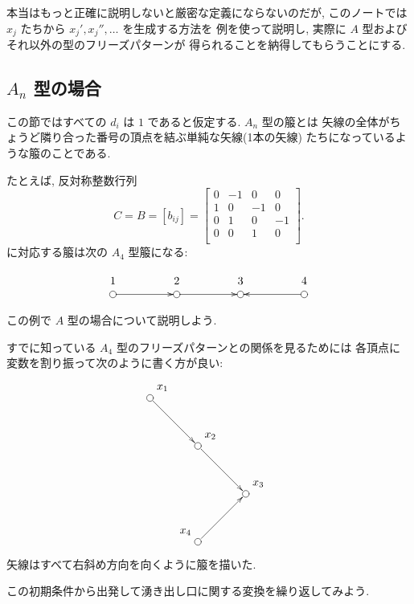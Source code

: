 \documentclass[12pt,twoside,dvipdfm]{jarticle}
\theoremstyle{definition} %
\theoremstyle{definition} %
\theoremstyle{definition} %
\numberwithin{theorem}{section}
\numberwithin{equation}{section}
\numberwithin{figure}{section}
\numberwithin{table}{section}
\begin{document}
本当はもっと正確に説明しないと厳密な定義にならないのだが, 
このノートでは $x_j$ たちから $x_j',x_j'',\ldots$ を生成する方法を
例を使って説明し, 実際に $A$ 型およびそれ以外の型のフリーズパターンが
得られることを納得してもらうことにする.


\subsection{$A_n$ 型の場合}

この節ではすべての $d_i$ は $1$ であると仮定する.
$A_n$ 型の箙とは
矢線の全体がちょうど隣り合った番号の頂点を結ぶ単純な矢線(1本の矢線)
たちになっているような箙のことである.

たとえば, 反対称整数行列
\begin{equation*}
C = B = [b_{ij}] =
\begin{bmatrix}
  0 &-1 & 0 & 0 \\
  1 & 0 &-1 & 0 \\
  0 & 1 & 0 &-1 \\
  0 & 0 & 1 & 0 \\
\end{bmatrix}.
\end{equation*}
に対応する箙は次の $A_4$ 型箙になる:
\[
\begin{xy}
 ( 0,10) *+[Fo]{}="1"*+++!D{1},
 (20,10) *+[Fo]{}="2"*+++!D{2},
 (40,10) *+[Fo]{}="3"*+++!D{3},
 (60,10) *+[Fo]{}="4"*+++!D{4},
 \ar@{->}"1";"2",
 \ar@{->}"2";"3",
 \ar@{->}"4";"3"
\end{xy}
\]
この例で $A$ 型の場合について説明しよう.

すでに知っている $A_4$ 型のフリーズパターンとの関係を見るためには
各頂点に変数を割り振って次のように書く方が良い:
\[
\begin{xy}
 ( 0,45) *+[Fo]{}="1"*++!DL{x_1},
 (15,30) *+[Fo]{}="2"*++!DL{x_2},
 (30,15) *+[Fo]{}="3"*++!DL{x_3},
 (15, 0) *+[Fo]{}="4"*++!DR{x_4},
 \ar@{->}"1";"2",
 \ar@{->}"2";"3",
 \ar@{->}"4";"3"
\end{xy}
\]
矢線はすべて右斜め方向を向くように箙を描いた.

この初期条件から出発して湧き出し口に関する変換を繰り返してみよう.
\end{document}
